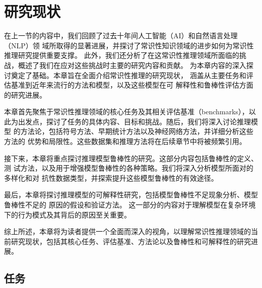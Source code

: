 \section{研究现状}
\label{sec1:related}
在上一节的内容中，我们回顾了过去十年间人工智能（AI）和自然语言处理（NLP）领
域所取得的显著进展，并探讨了常识性知识领域的进步如何为常识性推理研究提供重要支撑。
此外，我们还分析了在这常识性推理领域所面临的挑战，概述了我们在应对这些挑战时主要的研究内容和贡献。
为本章内容的深入探讨奠定了基础。本章旨在全面介绍常识性推理的研究现状，
涵盖从主要任务和评估基准到近年来流行的方法和模型，以及这些模型在可
解释性和鲁棒性评估方面的研究进展。

本章首先聚焦于常识性推理领域的核心任务及其相关评估基准（benchmarks），以
此为出发点，探讨了任务的具体内容、目标和挑战。随后，我们将深入讨论推理模型
的方法论，包括符号方法、早期统计方法以及神经网络方法，并详细分析这些方法的
优势和局限性。这些数据集和推理方法将在后续章节中将被频繁引用。

接下来，本章将重点探讨推理模型鲁棒性的研究。这部分内容包括鲁棒性的定义、测
试方法，以及用于增强模型鲁棒性的各种策略。我们将深入分析模型所面对的多样化和对
抗性数据类型，并探索提升这些模型鲁棒性的有效途径。

最后，本章将探讨推理模型的可解释性研究，包括模型鲁棒性不足现象分析、模型鲁棒性不足的
原因的假设和验证方法。
这一部分的内容对于理解模型在复杂环境下的行为模式及其背后的原因至关重要。

综上所述，本章将为读者提供一个全面而深入的视角，以理解常识性推理领域的当
前研究现状，包括其核心任务、评估基准、方法论以及鲁棒性和可解释性的研究进展。




\subsection{任务}
\label{sec1:task}


